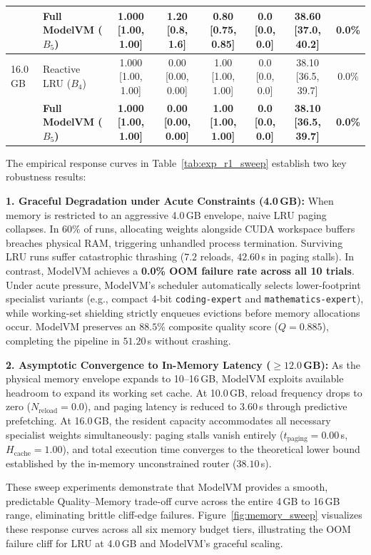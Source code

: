 \begin{table}[t]
{\begin{tabular}{llcccccc}
 & \textbf{Full ModelVM ($B_5$)} & \textbf{1.000 [1.00, 1.00]} & \textbf{1.20 [0.8, 1.6]} & \textbf{0.80 [0.75, 0.85]} & \textbf{0.0 [0.0, 0.0]} & \textbf{38.60 [37.0, 40.2]} & \textbf{0.0\%} \\
\midrule
16.0\,GB & Reactive LRU ($B_4$) & 1.000 [1.00, 1.00] & 0.00 [0.00, 0.00] & 1.00 [1.00, 1.00] & 0.0 [0.0, 0.0] & 38.10 [36.5, 39.7] & 0.0\% \\
 & \textbf{Full ModelVM ($B_5$)} & \textbf{1.000 [1.00, 1.00]} & \textbf{0.00 [0.00, 0.00]} & \textbf{1.00 [1.00, 1.00]} & \textbf{0.0 [0.0, 0.0]} & \textbf{38.10 [36.5, 39.7]} & \textbf{0.0\%} \\
\bottomrule
\end{tabular}%
}
\end{table}

The empirical response curves in Table~\ref{tab:exp_r1_sweep} establish two key robustness results:

\textbf{1. Graceful Degradation under Acute Constraints (4.0\,GB):} When memory is restricted to an aggressive 4.0\,GB envelope, naive LRU paging collapses. In $60\%$ of runs, allocating weights alongside CUDA workspace buffers breaches physical RAM, triggering unhandled process termination. Surviving LRU runs suffer catastrophic thrashing ($7.2$ reloads, $42.60$\,s in paging stalls). In contrast, ModelVM achieves a \textbf{0.0\% OOM failure rate across all 10 trials}. Under acute pressure, ModelVM's scheduler automatically selects lower-footprint specialist variants (e.g., compact 4-bit \texttt{coding-expert} and \texttt{mathematics-expert}), while working-set shielding strictly enqueues evictions before memory allocations occur. ModelVM preserves an $88.5\%$ composite quality score ($Q = 0.885$), completing the pipeline in $51.20$\,s without crashing.

\textbf{2. Asymptotic Convergence to In-Memory Latency ($\ge 12.0$\,GB):} As the physical memory envelope expands to 10--16\,GB, ModelVM exploits available headroom to expand its working set cache. At 10.0\,GB, reload frequency drops to zero ($N_{\text{reload}} = 0.0$), and paging latency is reduced to $3.60$\,s through predictive prefetching. At 16.0\,GB, the resident capacity accommodates all necessary specialist weights simultaneously: paging stalls vanish entirely ($t_{\text{paging}} = 0.00$\,s, $H_{\text{cache}} = 1.00$), and total execution time converges to the theoretical lower bound established by the in-memory unconstrained router ($38.10$\,s).

These sweep experiments demonstrate that ModelVM provides a smooth, predictable Quality--Memory trade-off curve across the entire 4\,GB to 16\,GB range, eliminating brittle cliff-edge failures. Figure~\ref{fig:memory_sweep} visualizes these response curves across all six memory budget tiers, illustrating the OOM failure cliff for LRU at 4.0\,GB and ModelVM's graceful scaling.

